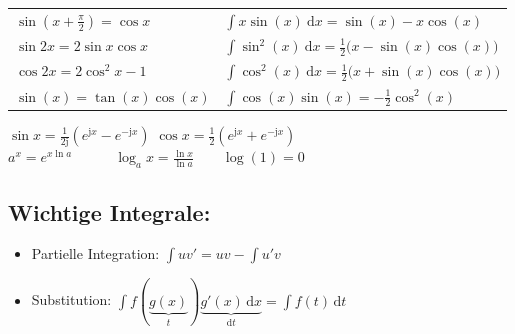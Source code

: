 \documentclass[6pt,a4paper]{scrartcl}
\renewcommand{\i}{\ensuremath{\mathrm{j}}}										%
\newcommand{\diff}{\ensuremath{\ \mathrm d}}									%
\begin{document}
\begin{multicols}{4}
\begin{tabular}{l  l}
 	 $\sin (x + \frac{\pi}{2}) = \cos x$ & $\int x \sin(x) \diff x = \sin(x) - x \cos(x)$\\
 	
 	$\sin 2x = 2 \sin x \cos x $  & $\int \sin^2(x) \diff x = \frac12 \bigl(x - \sin(x)\cos(x) \bigr)$\\
     
 	$\cos 2x = 2\cos^2 x - 1$  & $\int \cos^2(x) \diff x = \frac12 \bigl(x + \sin(x)\cos(x) \bigr)$\\

 	$\sin(x) = \tan(x)\cos(x)$ & $\int \cos(x)\sin(x) = -\frac12 \cos^2(x)$ \\
\end{tabular}

$\sin x = \frac{1}{2\i} ( e^{\i x} - e^{- \i x})$ \qquad $\cos x = \frac{1}{2}( e^{\i x} + e^{- \i x})$\\
$a^x = e^{x \ln a} \qquad \quad \log_a x = \frac{\ln x}{\ln a} \qquad \log(1) = 0$

\subsection{Wichtige Integrale:}
\begin{itemize}\itemsep-3pt
\item Partielle Integration: $\int uv'=uv-\int u'v$
\item Substitution: $\int f(\underbrace {g(x)}_{t}) \underbrace {g'(x)\,\mathrm dx}_{\mathrm dt}=\int f(t)\, \mathrm dt$
\end{itemize}


\end{multicols}
\end{document}
